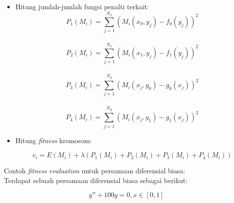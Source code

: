 \begin{enumerate}[1.]
\begin{enumerate}[1.]
\begin{enumerate}[1.]
\begin{itemize}
					\item Hitung jumlah-jumlah fungsi penalti terkait:
					\\
					\begin{displaymath} P_1(M_i) = \sum_{j=1}^{N_x}(M_i(x_0,y_j)-f_0(y_j))^{2} \end{displaymath}
					\\
					\begin{displaymath} P_2(M_i) = \sum_{j=1}^{N_x}(M_i(x_1,y_j)-f_1(y_j))^{2} \end{displaymath}
					\\
					\begin{displaymath} P_3(M_i) = \sum_{j=1}^{N_y}(M_i(x_j,y_0)-g_0(x_j))^{2} \end{displaymath}
					\\
					\begin{displaymath} P_4(M_i) = \sum_{j=1}^{N_y}(M_i(x_j,y_1)-g_1(x_j))^{2} \end{displaymath}

					\item Hitung \textit{fitness} kromosom:

					\begin{equation} v_i = E(M_i) +\lambda(P_1(M_i)+P_2(M_i)+P_3(M_i)+P_4(M_i)) \end{equation}

				\end{itemize}

		\end{enumerate}

\end{enumerate}

Contoh \textit{fitness evaluation} untuk persamaan diferensial biasa:
\\
Terdapat sebuah persamaan diferensial biasa sebagai berikut:

	\begin{displaymath} y''+100y = 0, x \in [0, 1] \end{displaymath}


\end{enumerate}
